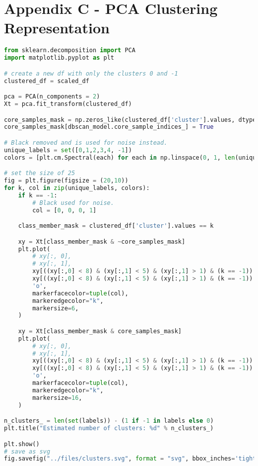\chapter{Appendix C - PCA Clustering Representation}
\label{app:pca}



\begin{lstlisting}[language=Python]
from sklearn.decomposition import PCA
import matplotlib.pyplot as plt

# create a new df with only the clusters 0 and -1
clustered_df = scaled_df

pca = PCA(n_components = 2)
Xt = pca.fit_transform(clustered_df)

core_samples_mask = np.zeros_like(clustered_df['cluster'].values, dtype=bool)
core_samples_mask[dbscan_model.core_sample_indices_] = True

# Black removed and is used for noise instead.
unique_labels = set([0,1,2,3,4, -1])
colors = [plt.cm.Spectral(each) for each in np.linspace(0, 1, len(unique_labels))]

# set the size of 25
fig = plt.figure(figsize = (20,10))
for k, col in zip(unique_labels, colors):
    if k == -1:
        # Black used for noise.
        col = [0, 0, 0, 1]

    class_member_mask = clustered_df['cluster'].values == k

    xy = Xt[class_member_mask & ~core_samples_mask]
    plt.plot(
        # xy[:, 0],
        # xy[:, 1],
        xy[((xy[:,0] < 8) & (xy[:,1] < 5) & (xy[:,1] > 1) & (k == -1)) | (k != -1), 0],
        xy[((xy[:,0] < 8) & (xy[:,1] < 5) & (xy[:,1] > 1) & (k == -1)) | (k != -1), 1],
        'o',
        markerfacecolor=tuple(col),
        markeredgecolor="k",
        markersize=6,
    )

    xy = Xt[class_member_mask & core_samples_mask]
    plt.plot(
        # xy[:, 0],
        # xy[:, 1],
        xy[((xy[:,0] < 8) & (xy[:,1] < 5) & (xy[:,1] > 1) & (k == -1)) | (k != -1), 0],
        xy[((xy[:,0] < 8) & (xy[:,1] < 5) & (xy[:,1] > 1) & (k == -1)) | (k != -1), 1],
        'o',
        markerfacecolor=tuple(col),
        markeredgecolor="k",
        markersize=16,
    )

n_clusters_ = len(set(labels)) - (1 if -1 in labels else 0)
plt.title("Estimated number of clusters: %d" % n_clusters_)

plt.show()
# save as svg
fig.savefig("../files/clusters.svg", format = "svg", bbox_inches='tight')

\end{lstlisting}
